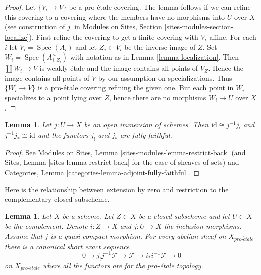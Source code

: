 \documentclass{stacks-project}
\theoremstyle{plain}
\newtheorem{lemma}[subsection]{Lemma}
\theoremstyle{definition}
\theoremstyle{remark}
\numberwithin{equation}{subsection}
\def\Spec{\mathop{\mathrm{Spec}}}
\def\proetale{{pro\text{-}\acute{e}tale}}
\begin{document}
\begin{proof}
Let $\{V_i \to V\}$ be a pro-\'etale covering. The lemma follows if we
can refine this covering to a covering where the members have no
morphisms into $U$ over $X$ (see construction of $j_!$ in
Modules on Sites, Section \ref{sites-modules-section-localize}).
First refine the covering to get a finite covering with $V_i$ affine.
For each $i$ let $V_i = \Spec(A_i)$ and let $Z_i \subset V_i$ be the
inverse image of $Z$.
Set $W_i = \Spec(A_{i, Z_i}^\sim)$ with notation as in
Lemma \ref{lemma-localization}.
Then $\coprod W_i \to V$ is weakly \'etale and the image contains all
points of $V_Z$. Hence the image contains all points of $V$ by
our assumption on specializations. Thus $\{W_i \to V\}$ is a
pro-\'etale covering refining the given one. But each point in $W_i$
specializes to a point lying over $Z$, hence there are no morphisms
$W_i \to U$ over $X$.
\end{proof}

\begin{lemma}
\label{lemma-open-immersion}
Let $j : U \to X$ be an open immersion of schemes.
Then $\text{id} \cong j^{-1}j_!$ and $j^{-1}j_* \cong \text{id}$
and the functors $j_!$ and $j_*$ are fully faithful.
\end{lemma}

\begin{proof}
See Modules on Sites, Lemma \ref{sites-modules-lemma-restrict-back}
(and Sites, Lemma \ref{sites-lemma-restrict-back} for the case
of sheaves of sets) and
Categories, Lemma \ref{categories-lemma-adjoint-fully-faithful}.
\end{proof}

\noindent
Here is the relationship between extension by zero and restriction
to the complementary closed subscheme.

\begin{lemma}
\label{lemma-ses-associated-to-open}
Let $X$ be a scheme. Let $Z \subset X$ be a closed subscheme and let
$U \subset X$ be the complement. Denote $i : Z \to X$ and $j : U \to X$
the inclusion morphisms. Assume that $j$ is a quasi-compact morphism.
For every abelian sheaf on $X_\proetale$ there is a canonical short exact
sequence
$$
0 \to j_!j^{-1}\mathcal{F} \to \mathcal{F} \to i_*i^{-1}\mathcal{F} \to 0
$$
on $X_\proetale$ where all the functors are for the pro-\'etale topology.
\end{lemma}
\end{document}
